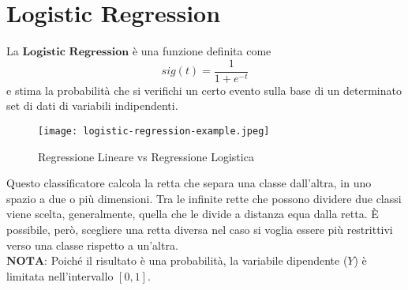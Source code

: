 \section{Logistic Regression}
    La $\textbf{Logistic Regression}$ è una funzione definita come $$ sig(t) = \frac{1}{1+e^{-t}} $$
    e stima la probabilità che si verifichi un certo evento sulla base di un determinato set di dati di variabili indipendenti.
    
    \begin{figure}[h]
        \caption{Regressione Lineare vs Regressione Logistica}
        \centering
        \texttt{[image: logistic-regression-example.jpeg]}
    \end{figure}
    
    \clearpage

    Questo classificatore calcola la retta che separa una classe dall'altra, in uno spazio a due o più dimensioni.
    Tra le infinite rette che possono dividere due classi viene scelta, generalmente, quella che le divide a distanza equa dalla retta.
    È possibile, però, scegliere una retta diversa nel caso si voglia essere più restrittivi verso una classe rispetto a un'altra.
    \\[1\baselineskip]
    $\textbf{NOTA:}$ Poiché il risultato è una probabilità, la variabile dipendente ($Y$) è limitata nell'intervallo $[0,1]$.

    \clearpage